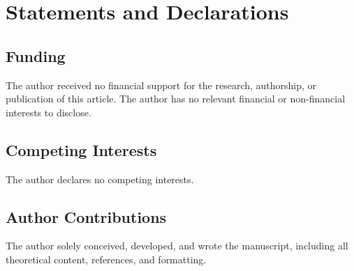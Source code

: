 \documentclass[entropy,article,submit,pdftex,moreauthors]{Definitions/mdpi}
\begin{document}


\section*{Statements and Declarations}
\subsection*{Funding}  
The author received no financial support for the research, authorship, or publication of this article.
The author has no relevant financial or non-financial interests to disclose.

\subsection*{Competing Interests}  
The author declares no competing interests.

\subsection*{Author Contributions}  
The author solely conceived, developed, and wrote the manuscript, including all theoretical content, references, and formatting.
\end{document}

